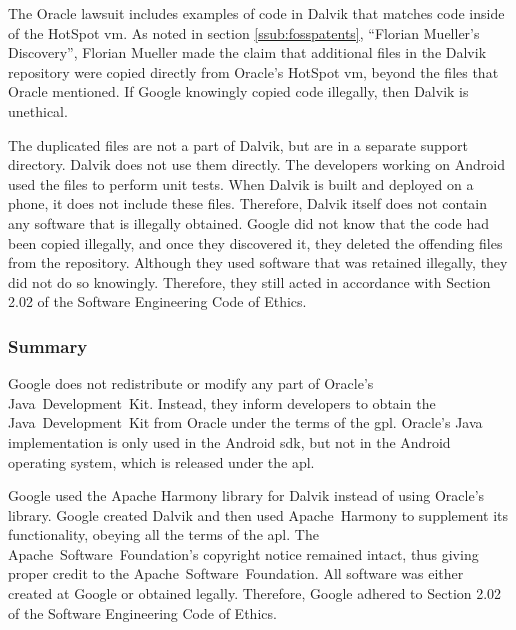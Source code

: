 \documentclass[11pt]{article}
\begin{document}
\begin{multicols}{2}
The Oracle lawsuit includes examples of code in Dalvik that matches code inside
of the HotSpot \gls{vm}. \cite{exhibitj} As noted in section
\ref{ssub:fosspatents}, ``Florian Mueller's Discovery'', Florian Mueller made
the claim that additional files in the Dalvik repository were copied directly
from Oracle's HotSpot \gls{vm}, beyond the files that Oracle mentioned.
\cite{fosspatents}  If Google knowingly copied code illegally, then Dalvik is
unethical.

The duplicated files are not a part of Dalvik, but are in a separate support
directory.  Dalvik does not use them directly.  The developers working on
Android used the files to perform unit tests.  When Dalvik is built and deployed
on a phone, it does not include these files. \cite{zdnet-copying} Therefore,
Dalvik itself does not contain any software that is illegally obtained.  Google
did not know that the code had been copied illegally, and once they discovered
it, they deleted the offending files from the repository.  Although they used
software that was retained illegally, they did not do so knowingly.  Therefore,
they still acted in accordance with Section 2.02 of the Software Engineering
Code of Ethics.


\subsubsection{Summary} %
\label{ssub:licensing-summary}

Google does not redistribute or modify any part of Oracle's
Java~Development~Kit.  Instead, they inform developers to obtain the
Java~Development~Kit from Oracle under the terms of the \gls{gpl}.  Oracle's
Java implementation is only used in the Android \gls{sdk}, but not in the
Android operating system, which is released under the \gls{apl}.

Google used the Apache Harmony \gls{library} for Dalvik instead of using
Oracle's \gls{library}.  Google created Dalvik and then used Apache~Harmony to
supplement its functionality, obeying all the terms of the \gls{apl}.  The
Apache~Software~Foundation's copyright notice remained intact, thus giving
proper credit to the Apache~Software~Foundation. All software was either created
at Google or obtained legally.  Therefore, Google adhered to Section 2.02 of the
Software Engineering Code of Ethics.



\end{multicols}
\end{document}
